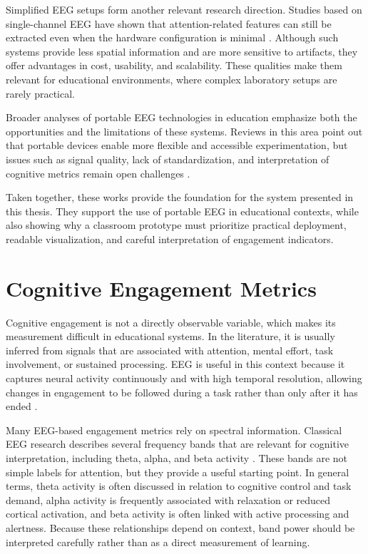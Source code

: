 Simplified EEG setups form another relevant research direction. Studies based on single-channel EEG have shown that attention-related features can still be extracted even when the hardware configuration is minimal \cite{Liang2022}. Although such systems provide less spatial information and are more sensitive to artifacts, they offer advantages in cost, usability, and scalability. These qualities make them relevant for educational environments, where complex laboratory setups are rarely practical.


Broader analyses of portable EEG technologies in education emphasize both the opportunities and the limitations of these systems. Reviews in this area point out that portable devices enable more flexible and accessible experimentation, but issues such as signal quality, lack of standardization, and interpretation of cognitive metrics remain open challenges \cite{Xu2018}.


Taken together, these works provide the foundation for the system presented in this thesis. They support the use of portable EEG in educational contexts, while also showing why a classroom prototype must prioritize practical deployment, readable visualization, and careful interpretation of engagement indicators.

\section{Cognitive Engagement Metrics}\label{sect:cognmet}
Cognitive engagement is not a directly observable variable, which makes its measurement difficult in educational systems. In the literature, it is usually inferred from signals that are associated with attention, mental effort, task involvement, or sustained processing. EEG is useful in this context because it captures neural activity continuously and with high temporal resolution, allowing changes in engagement to be followed during a task rather than only after it has ended \cite{Wolpaw2012}.


Many EEG-based engagement metrics rely on spectral information. Classical EEG research describes several frequency bands that are relevant for cognitive interpretation, including theta, alpha, and beta activity \cite{Niedermeyer2005}. These bands are not simple labels for attention, but they provide a useful starting point. In general terms, theta activity is often discussed in relation to cognitive control and task demand, alpha activity is frequently associated with relaxation or reduced cortical activation, and beta activity is often linked with active processing and alertness. Because these relationships depend on context, band power should be interpreted carefully rather than as a direct measurement of learning.


